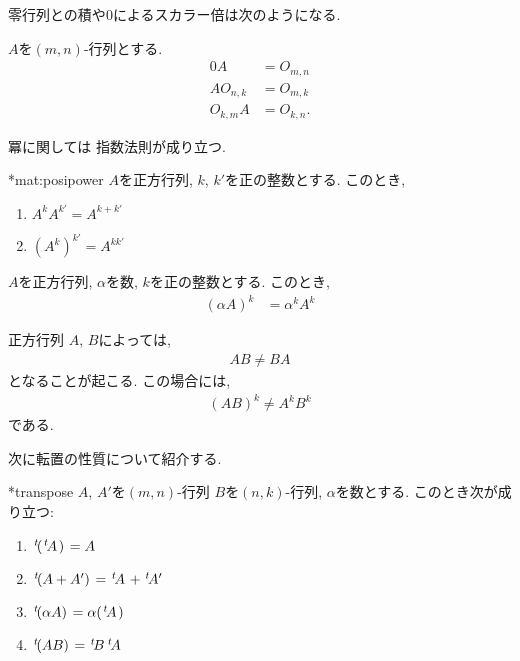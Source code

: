 零行列との積や$0$によるスカラー倍は次のようになる.
\begin{prop}
  $A$を$(m,n)$-行列とする.
  \begin{align*}
    0A&=O_{m,n}\\
    A O_{n,k}&=O_{m,k}\\
    O_{k,m} A&=O_{k,n}.
  \end{align*}
\end{prop}

冪に関しては
指数法則が成り立つ.
\begin{prop}
  \provelater**{mat:posipower}
  \label{thm:mat:posipower}
  $A$を正方行列, $k$, $k'$を正の整数とする.
  このとき,
  \begin{enumerate}
  \item {}
    $A^kA^{k'}=A^{k+k'}$
  \item {}
    $(A^k)^{k'}=A^{kk'}$
  \end{enumerate}
\end{prop}

\begin{prop}
  $A$を正方行列, $\alpha$を数, $k$を正の整数とする.
  このとき,
  \begin{align*}
    (\alpha A)^k&=\alpha^k A^{k}
  \end{align*}
\end{prop}

\begin{remark}
正方行列
$A$, $B$によっては,
\begin{align*}
  AB\neq BA
\end{align*}
となることが起こる.  この場合には,
\begin{align*}
  (AB)^k \neq A^kB^k
\end{align*}
である.
\end{remark}

次に転置の性質について紹介する.
\begin{prop}
  \provelater**{transpose}
  $A$, $A'$を$(m,n)$-行列
  $B$を$(n,k)$-行列,
  $\alpha$を数とする.
  このとき次が成り立つ:
  \begin{enumerate}
  \item {}
    ${\left.^{t}\!({\left.^{t}\!A\right.})\right.}=A$
  \item {}
    ${\left.^{t}\!(A+A')\right.}={\left.^{t}\!A\right.}+{\left.^{t}\!A'\right.}$
  \item {}
    ${\left.^{t}\!(\alpha A)\right.}=\alpha({\left.^{t}\!A\right.})$
  \item {}
    ${\left.^{t}\!(AB)\right.}={\left.^{t}\!B\right.}{\left.^{t}\!A\right.}$
  \end{enumerate}
\end{prop}

